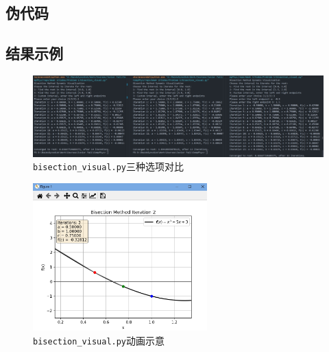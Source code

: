 \subsection{伪代码}

\subsection{结果示例}
\begin{figure}[h]
    \centering
    \includegraphics[width=1.0\textwidth]{./Figs/1_bisection.png}
    \caption{\texttt{bisection\_visual.py}三种选项对比}
    \label{fig:1_py_bisection}
\end{figure}

\begin{figure}[H]
    \centering
    \includegraphics[width=0.6\textwidth]{./Figs/1_animation.png}
    \caption{\texttt{bisection\_visual.py}动画示意}
    \label{fig:1_py_animation}
\end{figure}

